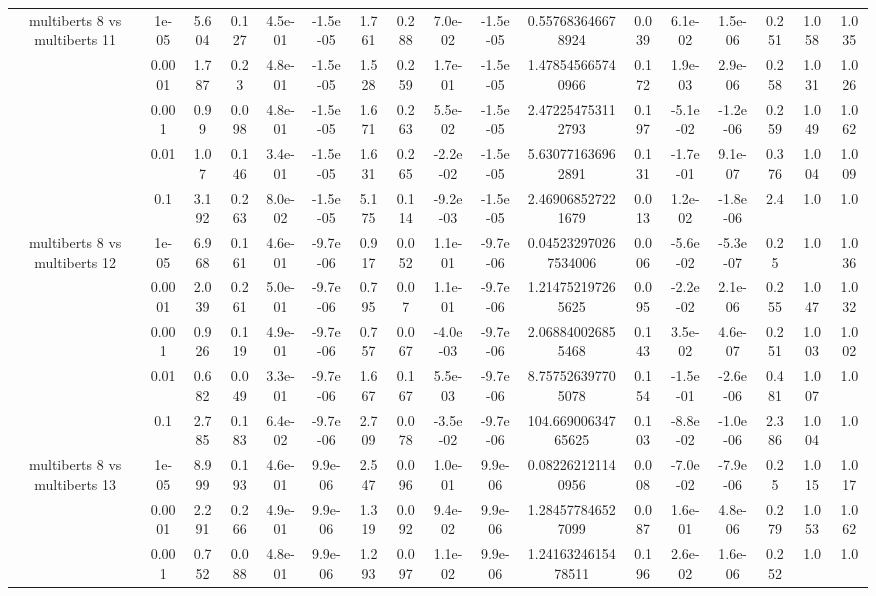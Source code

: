 \begin{tabular}{|c|c|c|c|c|c|c|c|c|c|c|c|c|c|c|c|c|}
\hline
\multirow{5}{*}{multiberts 8 vs multiberts 11} & 1e-05 & 5.604 & 0.127 & 4.5e-01 & -1.5e-05 & 1.761 & 0.288 & 7.0e-02 & -1.5e-05 & 0.557683646678924 & 0.039 & 6.1e-02 & 1.5e-06 & 0.251 & 1.058 & 1.035 \\
 & 0.0001 & 1.787 & 0.23 & 4.8e-01 & -1.5e-05 & 1.528 & 0.259 & 1.7e-01 & -1.5e-05 & 1.478545665740966 & 0.172 & 1.9e-03 & 2.9e-06 & 0.258 & 1.031 & 1.026 \\
 & 0.001 & 0.99 & 0.098 & 4.8e-01 & -1.5e-05 & 1.671 & 0.263 & 5.5e-02 & -1.5e-05 & 2.472254753112793 & 0.197 & -5.1e-02 & -1.2e-06 & 0.259 & 1.049 & 1.062 \\
 & 0.01 & 1.07 & 0.146 & 3.4e-01 & -1.5e-05 & 1.631 & 0.265 & -2.2e-02 & -1.5e-05 & 5.630771636962891 & 0.131 & -1.7e-01 & 9.1e-07 & 0.376 & 1.004 & 1.009 \\
 & 0.1 & 3.192 & 0.263 & 8.0e-02 & -1.5e-05 & 5.175 & 0.114 & -9.2e-03 & -1.5e-05 & 2.469068527221679 & 0.013 & 1.2e-02 & -1.8e-06 & 2.4 & 1.0 & 1.0 \\
\hline
\multirow{5}{*}{multiberts 8 vs multiberts 12} & 1e-05 & 6.968 & 0.161 & 4.6e-01 & -9.7e-06 & 0.917 & 0.052 & 1.1e-01 & -9.7e-06 & 0.045232970267534006 & 0.006 & -5.6e-02 & -5.3e-07 & 0.25 & 1.0 & 1.036 \\
 & 0.0001 & 2.039 & 0.261 & 5.0e-01 & -9.7e-06 & 0.795 & 0.07 & 1.1e-01 & -9.7e-06 & 1.214752197265625 & 0.095 & -2.2e-02 & 2.1e-06 & 0.255 & 1.047 & 1.032 \\
 & 0.001 & 0.926 & 0.119 & 4.9e-01 & -9.7e-06 & 0.757 & 0.067 & -4.0e-03 & -9.7e-06 & 2.068840026855468 & 0.143 & 3.5e-02 & 4.6e-07 & 0.251 & 1.003 & 1.002 \\
 & 0.01 & 0.682 & 0.049 & 3.3e-01 & -9.7e-06 & 1.667 & 0.167 & 5.5e-03 & -9.7e-06 & 8.757526397705078 & 0.154 & -1.5e-01 & -2.6e-06 & 0.481 & 1.007 & 1.0 \\
 & 0.1 & 2.785 & 0.183 & 6.4e-02 & -9.7e-06 & 2.709 & 0.078 & -3.5e-02 & -9.7e-06 & 104.66900634765625 & 0.103 & -8.8e-02 & -1.0e-06 & 2.386 & 1.004 & 1.0 \\
\hline
\multirow{5}{*}{multiberts 8 vs multiberts 13} & 1e-05 & 8.999 & 0.193 & 4.6e-01 & 9.9e-06 & 2.547 & 0.096 & 1.0e-01 & 9.9e-06 & 0.082262121140956 & 0.008 & -7.0e-02 & -7.9e-06 & 0.25 & 1.015 & 1.017 \\
 & 0.0001 & 2.291 & 0.266 & 4.9e-01 & 9.9e-06 & 1.319 & 0.092 & 9.4e-02 & 9.9e-06 & 1.284577846527099 & 0.087 & 1.6e-01 & 4.8e-06 & 0.279 & 1.053 & 1.062 \\
 & 0.001 & 0.752 & 0.088 & 4.8e-01 & 9.9e-06 & 1.293 & 0.097 & 1.1e-02 & 9.9e-06 & 1.2416324615478511 & 0.196 & 2.6e-02 & 1.6e-06 & 0.252 & 1.0 & 1.0 \\

\end{tabular}
